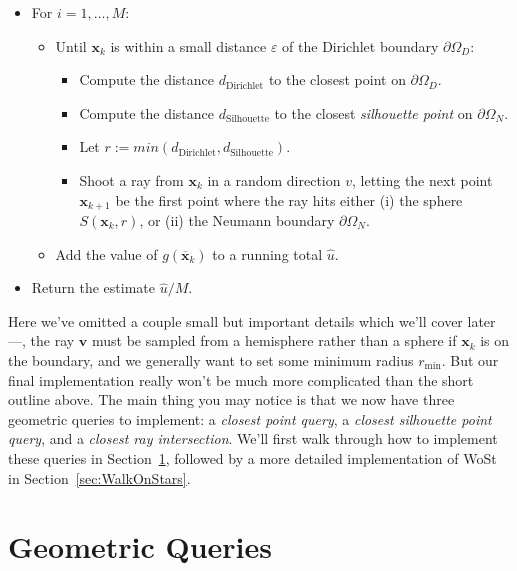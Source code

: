 \documentclass{article}
\renewcommand{\vec}[1]{\textbf{#1}}
\begin{document}
\begin{itemize}
   \item For \(i = 1, \ldots, M\):
\begin{itemize}
   \item Until \(\vec{x}_k\) is within a small distance \(\varepsilon\) of the Dirichlet boundary \(\partial\Omega_D\):
      \begin{itemize}
         \item Compute the distance \(d_{\text{Dirichlet}}\) to the closest point on \(\partial\Omega_D\).
         \item Compute the distance \(d_{\text{Silhouette}}\) to the closest \emph{silhouette point} on \(\partial\Omega_N\).
         \item Let \(r := min(d_{\text{Dirichlet}},d_{\text{Silhouette}})\).
         \item Shoot a ray from \(\vec{x}_k\) in a random direction \(v\), letting the next point \(\vec{x}_{k+1}\) be the first point where the ray hits either (i) the sphere \(S(\vec{x}_k,r)\), or (ii) the Neumann boundary \(\partial\Omega_N\).
      \end{itemize}
   \item Add the value of \(g(\overline{\vec{x}}_k)\) to a running total \(\widehat{u}\).
\end{itemize}
   \item Return the estimate \(\widehat{u}/M\).
\end{itemize}

Here we've omitted a couple small but important details which we'll cover later---\eg{}, the ray \(\vec{v}\) must be sampled from a hemisphere rather than a sphere if \(\vec{x}_k\) is on the boundary, and we generally want to set some minimum radius \(r_{\min}\).  But our final implementation really won't be much more complicated than the short outline above.  The main thing you may notice is that we now have three geometric queries to implement: a \emph{closest point query}, a \emph{closest silhouette point query}, and a \emph{closest ray intersection}.  We'll first walk through how to implement these queries in Section~\ref{sec:GeometricQueries}, followed by a more detailed implementation of WoSt in Section~\ref{sec:WalkOnStars}.


\section{Geometric Queries}
\label{sec:GeometricQueries}
\end{document}
